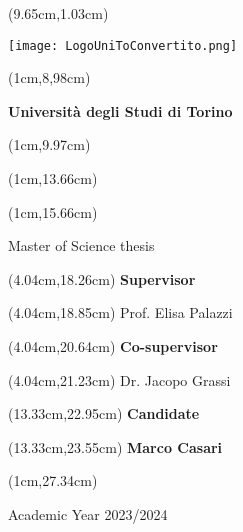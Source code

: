 \documentclass[a4paper,10 pt,titlepage,twoside]{book}
\begin{document}
\frontmatter

\thispagestyle{empty}

\begingroup
\TahomaFont


\begin{textblock*}{4cm}(9.65cm,1.03cm)
	\centerline {\texttt{[image: LogoUniToConvertito.png]}}
\end{textblock*}


\begin{textblock*}{21cm}(1cm,8,98cm)
	\fontsize{18}{22}\selectfont
	\centerline {\textbf{ Universit\`a degli Studi di Torino}}
\end{textblock*}
\begin{textblock*}{21cm}(1cm,9.97cm)
	\fontsize{18}{22}\selectfont
\end{textblock*}


\begin{textblock*}{21cm}(1cm,13.66cm)
	\fontsize{20}{24}\selectfont
\end{textblock*}
\begin{textblock*}{21cm}(1cm,15.66cm)
	\fontsize{18}{22}\selectfont
	\centerline{\Large {Master of Science thesis}}
\end{textblock*}



\fontsize{14}{17}\selectfont

\begin{textblock*}{8cm}(4.04cm,18.26cm)
	\noindent 
	\textbf{Supervisor}
\end{textblock*}
\begin{textblock*}{8cm}(4.04cm,18.85cm)
	\noindent 
	Prof. Elisa Palazzi
\end{textblock*}

\begin{textblock*}{8cm}(4.04cm,20.64cm)
	\noindent 
	\textbf{Co-supervisor}
\end{textblock*}
\begin{textblock*}{8cm}(4.04cm,21.23cm)
	\noindent
	Dr. Jacopo Grassi
\end{textblock*}

\begin{textblock*}{8cm}(13.33cm,22.95cm)
	\noindent
	\textbf{Candidate}
\end{textblock*}
\begin{textblock*}{8cm}(13.33cm,23.55cm)
	\noindent	\textbf{Marco Casari}
\end{textblock*}

\begin{textblock*}{21cm}(1cm,27.34cm)
	\centerline{Academic Year 2023/2024}
\end{textblock*}

\endgroup

\newpage
$ $

\newpage
$ $

\end{document}
